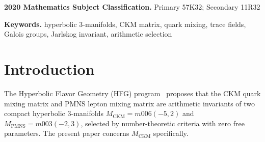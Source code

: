 \documentclass[11pt,a4paper]{article}
\theoremstyle{remark}
\newcommand{\MCKM}{M_{\mathrm{CKM}}}
\newcommand{\MPMNS}{M_{\mathrm{PMNS}}}
\newcommand{\subjclass}[2][2020]{\par\noindent\textbf{#1 Mathematics Subject Classification.} #2\par}
\newcommand{\keywords}[1]{\par\noindent\textbf{Keywords.} #1\par}
\begin{document}
\begin{abstract}
achieves Frobenius fitness $\mathcal{F} = 0.002728$
against PDG~2024 CKM values, with Cabibbo angle error $+0.33\%$.
The Jarlskog invariant $J = 0$ exactly because the construction produces
a real orthogonal matrix.
A structural theorem (Theorem~\ref{thm:galois_weyl}) shows that the
Galois group of the m006 cusp field is $S_3 \cong W(\mathrm{SU}(3))$,
the Weyl group of the colour gauge group---establishing the geometric
origin of the quark sector.
The K-factor construction is selected over the N-factor by the
strongly loxodromic geodesic twist spectrum of $\MCKM$
(mean $|\theta| = 131.8^\circ$, axis spread $66.3^\circ$):
the K-factor Frobenius floor $0.002727$ matches the observed fitness.
A null test against $200$ Haar-random unitary matrices gives $p = 0/200 < 0.005$;
the null minimum fitness $0.01131$ is $4\times$ larger than the CKM target.
Critically, a complete refinement of all 134 census manifolds with
$H_1 = \mathbb{Z}/5$ shows that $\MCKM$ ranks 82nd of 134 in raw Frobenius
fitness --- \emph{below} the census mean --- and that fitting the real CKM
matrix this well is a generic property of the $H_1 = \mathbb{Z}/5$ torsion
class (through $\sigma = 2/|H_1|$), not a special property of $\MCKM$'s
specific arithmetic.
We do not, therefore, claim that arithmetic selection explains the fitness:
the two are established here as independent facts about $\MCKM$, which we
argue is a cleaner and more falsifiable claim than a uniqueness-of-fit
framing would be.
\end{abstract}

\subjclass[2020]{Primary 57K32; Secondary 11R32}

\keywords{hyperbolic 3-manifolds, CKM matrix, quark mixing, trace fields,
Galois groups, Jarlskog invariant, arithmetic selection}

\section{Introduction}
\label{sec:intro}

The Hyperbolic Flavor Geometry (HFG) program~\cite{Gentry:Unified}
proposes that the CKM quark mixing matrix and PMNS lepton mixing matrix
are arithmetic invariants of two compact hyperbolic 3-manifolds
$\MCKM = m006(-5,2)$ and $\MPMNS = m003(-2,3)$, selected by
number-theoretic criteria with zero free parameters.
The present paper concerns $\MCKM$ specifically.
\end{document}
